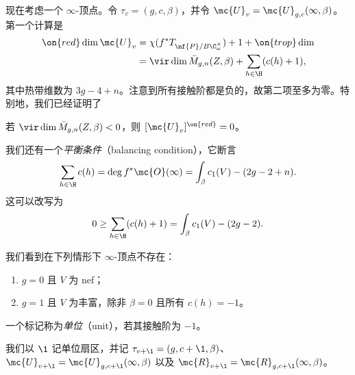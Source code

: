 现在考虑一个 \(\infty\)-顶点。令 \(\tau_v = (g, c, \beta)\)，并令 \(\mc{U}_v = \mc{U}_{g,c}(\infty, \beta)\)。第一个计算是
\begin{align*}
    \on{red}\dim \mc{U}_v &= \chi(f^* T_{\mf{P}/B \C^{\times}_{\omega}}) + 1 + \on{trop}\dim  \\
    &= \vir\dim \bar{M}_{g,n}(Z, \beta) + \sum_{h \in \H } (c(h) + 1),
\end{align*}
其中热带维数为 \(3g-4+n\)。注意到所有接触阶都是负的，故第二项至多为零。特别地，我们已经证明了
\begin{cor}
    若 \(\vir\dim \bar{M}_{g,n}(Z,\beta) < 0\)，则 \([\mc{U}_v]^{\on{red}} = 0\)。
\end{cor}
我们还有一个\textit{平衡条件}（balancing condition），它断言
\begin{equation}\label{eqn:balancing condition}
    \sum_{h \in \H} c(h) = \deg f^* \mc{O}(\infty) = \int_{\beta} c_1(V) - (2g-2+n).
\end{equation}
这可以改写为
\[ 0 \geq \sum_{h \in \H} (c(h)+1) = \int_{\beta} c_1(V) - (2g-2). \]
\begin{prop}
    我们看到在下列情形下 \(\infty\)-顶点不存在：
    \begin{enumerate}
        \item \(g = 0\) 且 \(V\) 为 nef；
        \item \(g=1\) 且 \(V\) 为丰富，除非 \(\beta = 0\) 且所有 \(c(h) = -1\)。
    \end{enumerate}
\end{prop}

\begin{defn}
    一个标记称为\textit{单位}（unit），若其接触阶为 \(-1\)。
\end{defn}

\begin{notn}
    我们以 \(\1\) 记单位扇区，并记 \(\tau_{v+\1} = (g, c+\1, \beta)\)、\(\mc{U}_{v+\1} = \mc{U}_{g, c+\1}(\infty, \beta)\) 以及 \(\mc{R}_{v+\1} = \mc{R}_{g, c+\1}(\infty, \beta)\)。
\end{notn}

